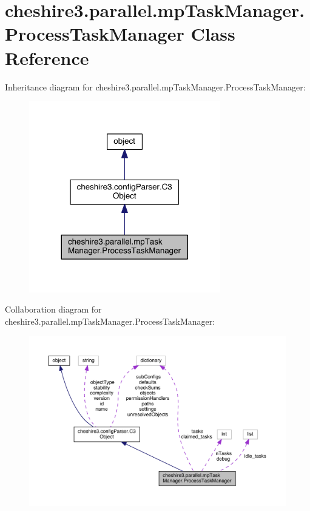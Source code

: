 \hypertarget{classcheshire3_1_1parallel_1_1mp_task_manager_1_1_process_task_manager}{\section{cheshire3.\-parallel.\-mp\-Task\-Manager.\-Process\-Task\-Manager Class Reference}
\label{classcheshire3_1_1parallel_1_1mp_task_manager_1_1_process_task_manager}
}


Inheritance diagram for cheshire3.\-parallel.\-mp\-Task\-Manager.\-Process\-Task\-Manager\-:
\nopagebreak
\begin{figure}[H]
\begin{center}
\leavevmode
\includegraphics[width=236pt]{classcheshire3_1_1parallel_1_1mp_task_manager_1_1_process_task_manager__inherit__graph}
\end{center}
\end{figure}


Collaboration diagram for cheshire3.\-parallel.\-mp\-Task\-Manager.\-Process\-Task\-Manager\-:
\nopagebreak
\begin{figure}[H]
\begin{center}
\leavevmode
\includegraphics[width=350pt]{classcheshire3_1_1parallel_1_1mp_task_manager_1_1_process_task_manager__coll__graph}
\end{center}
\end{figure}
